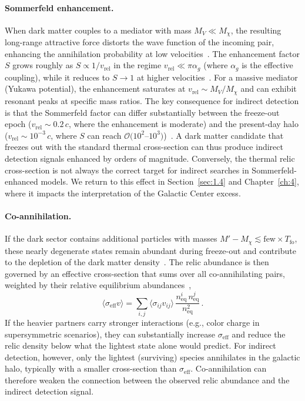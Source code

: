 \paragraph{Sommerfeld enhancement.}
When dark matter couples to a mediator with mass $M_V \ll M_\chi$, the resulting long-range attractive force distorts the wave function of the incoming pair, enhancing the annihilation probability at low velocities~\cite{Hisano:2004ds,ArkaniHamed:2008qn,Cirelli:2024ssz}.
The enhancement factor $S$ grows roughly as $S \propto 1/v_\mathrm{rel}$ in the regime $v_\mathrm{rel} \ll \pi\alpha_g$ (where $\alpha_g$ is the effective coupling), while it reduces to $S \to 1$ at higher velocities~\cite{Cirelli:2024ssz}.
For a massive mediator (Yukawa potential), the enhancement saturates at $v_\mathrm{rel} \sim M_V / M_\chi$ and can exhibit resonant peaks at specific mass ratios.
The key consequence for indirect detection is that the Sommerfeld factor can differ substantially between the freeze-out epoch ($v_\mathrm{rel} \sim 0.2\,c$, where the enhancement is moderate) and the present-day halo ($v_\mathrm{rel} \sim 10^{-3}\,c$, where $S$ can reach $\mathcal{O}(10^2$--$10^3)$)~\cite{Cirelli:2024ssz}.
A dark matter candidate that freezes out with the standard thermal cross-section can thus produce indirect detection signals enhanced by orders of magnitude.
Conversely, the thermal relic cross-section is not always the correct target for indirect searches in Sommerfeld-enhanced models.
We return to this effect in Section~\ref{sec:1.4} and Chapter~\ref{ch:4}, where it impacts the interpretation of the Galactic Center excess.

\paragraph{Co-annihilation.}
If the dark sector contains additional particles with masses $M' - M_\chi \lesssim \text{few} \times T_\mathrm{fo}$, these nearly degenerate states remain abundant during freeze-out and contribute to the depletion of the dark matter density~\cite{Ellis:1983ew,Griest:1990kh,Cirelli:2024ssz}.
The relic abundance is then governed by an effective cross-section that sums over all co-annihilating pairs, weighted by their relative equilibrium abundances~\cite{Cirelli:2024ssz},
\begin{equation}
	\langle \sigma_\mathrm{eff} v \rangle = \sum_{i,j} \langle \sigma_{ij} v_{ij} \rangle \, \frac{n_\mathrm{eq}^i \, n_\mathrm{eq}^j}{n_\mathrm{eq}^2} \,.
	\label{eq:coann}
\end{equation}
If the heavier partners carry stronger interactions (e.g., color charge in supersymmetric scenarios), they can substantially increase $\sigma_\mathrm{eff}$ and reduce the relic density below what the lightest state alone would predict.
For indirect detection, however, only the lightest (surviving) species annihilates in the galactic halo, typically with a smaller cross-section than $\sigma_\mathrm{eff}$.
Co-annihilation can therefore weaken the connection between the observed relic abundance and the indirect detection signal.

